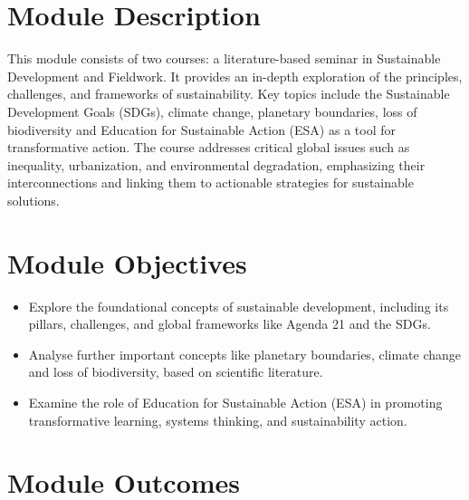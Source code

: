 \documentclass[
  letterpaper,
  10pt,
  openany]{book}
\providecommand{\tightlist}{%
  \setlength{\itemsep}{0pt}\setlength{\parskip}{0pt}}\usepackage{longtable,booktabs,array}
\begin{document}
\section*{Module Description}\label{module-description-1}


This module consists of two courses: a literature-based seminar in
Sustainable Development and Fieldwork. It provides an in-depth
exploration of the principles, challenges, and frameworks of
sustainability. Key topics include the Sustainable Development Goals
(SDGs), climate change, planetary boundaries, loss of biodiversity and
Education for Sustainable Action (ESA) as a tool for transformative
action. The course addresses critical global issues such as inequality,
urbanization, and environmental degradation, emphasizing their
interconnections and linking them to actionable strategies for
sustainable solutions.

\section*{Module Objectives}\label{module-objectives}


\begin{itemize}
\tightlist
\item
  Explore the foundational concepts of sustainable development,
  including its pillars, challenges, and global frameworks like Agenda
  21 and the SDGs.
\item
  Analyse further important concepts like planetary boundaries, climate
  change and loss of biodiversity, based on scientific literature.
\item
  Examine the role of Education for Sustainable Action (ESA) in
  promoting transformative learning, systems thinking, and
  sustainability action.
\end{itemize}

\section*{Module Outcomes}\label{module-outcomes}

\end{document}
